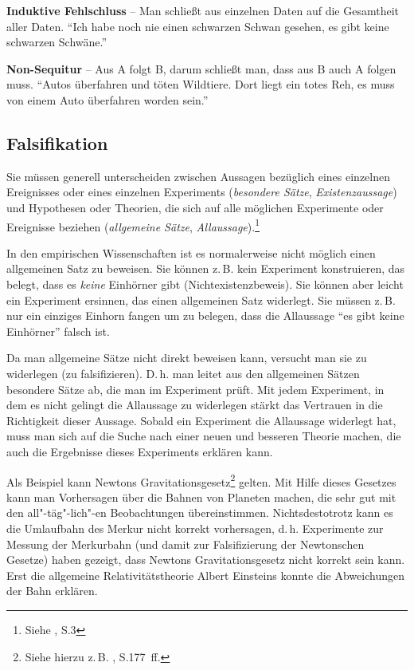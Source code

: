 \documentclass[a4paper,11pt,headings=normal]{scrartcl}
\begin{document}
\vspace{0.3cm}\noindent\textbf{Induktive Fehlschluss} -- Man schließt aus einzelnen Daten auf die Gesamtheit aller Daten. "`Ich habe noch nie einen schwarzen Schwan gesehen, es gibt keine schwarzen Schwäne."'

\vspace{0.3cm}\noindent\textbf{Non-Sequitur} -- Aus A folgt B, darum schließt man, dass aus B auch A folgen muss. "`Autos überfahren und töten Wildtiere. Dort liegt ein totes Reh, es muss von einem Auto überfahren worden sein."'


\subsection{Falsifikation}

Sie müssen generell unterscheiden zwischen Aussagen bezüglich eines einzelnen Ereignisses oder eines einzelnen Experiments (\textit{besondere Sätze}, \textit{Existenzaussage}) und Hypothesen oder Theorien, die sich auf alle möglichen Experimente oder Ereignisse beziehen (\textit{allgemeine Sätze}, \textit{Allaussage}).\footnote{Siehe \cite{Popper1969}, S.3}

In den empirischen Wissenschaften ist es normalerweise nicht möglich einen allgemeinen Satz zu beweisen. Sie können z.\,B. kein Experiment konstruieren, das belegt, dass es \textit{keine} Einhörner gibt (Nichtexistenzbeweis). Sie können aber leicht ein Experiment ersinnen, das einen allgemeinen Satz widerlegt. Sie müssen z.\,B. nur ein einziges Einhorn fangen um zu belegen, dass die Allaussage "`es gibt keine Einhörner"' falsch ist.

Da man allgemeine Sätze nicht direkt beweisen kann, versucht man sie zu widerlegen (zu falsifizieren). D.\,h. man leitet aus den allgemeinen Sätzen besondere Sätze ab, die man im Experiment prüft. Mit jedem Experiment, in dem es  nicht gelingt die Allaussage zu widerlegen stärkt das Vertrauen in die Richtigkeit dieser Aussage. Sobald ein Experiment die Allaussage widerlegt hat, muss man sich auf die Suche nach einer neuen und besseren Theorie machen, die auch die Ergebnisse dieses Experiments erklären kann.

Als Beispiel kann Newtons Gravitationsgesetz\footnote{Siehe hierzu z.\,B. \cite{Giancoli2010}, S.177~ff.} gelten. Mit Hilfe dieses Gesetzes kann man Vorhersagen über die Bahnen von Planeten machen, die sehr gut mit den all"-täg"-lich"-en Beobachtungen übereinstimmen. Nichtsdestotrotz kann es die Umlaufbahn des Merkur nicht korrekt vorhersagen, d.\,h. Experimente zur Messung der Merkurbahn (und damit zur Falsifizierung der Newtonschen Gesetze) haben gezeigt, dass Newtons Gravitationsgesetz nicht korrekt sein kann. Erst die allgemeine Relativitätstheorie Albert Einsteins konnte die Abweichungen der Bahn erklären.
\end{document}
